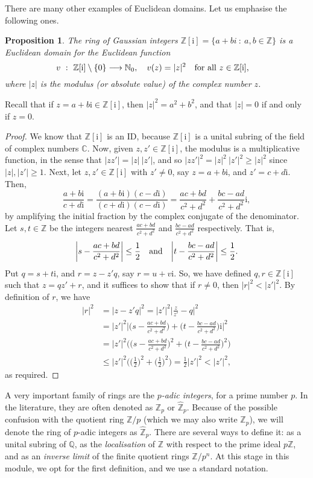 \documentclass[12pt]{article}
\newcommand{\qbox}[1]{\quad\hbox{#1}\quad}
\def\dst{\displaystyle}
\newtheorem{prop}[thm]{Proposition}
\theoremstyle{definition}
\newcounter{ex}\renewcommand\theex{\arabic{ex}}
\newcommand{\N}{\ensuremath{\mathbb{N}}}
\newcommand{\Z}{\ensuremath{\mathbb{Z}}}
\newcommand{\Q}{\ensuremath{\mathbb{Q}}}
\newcommand{\C}{\ensuremath{\mathbb{C}}}
\def\ii{\mathrm i}
\def\Zp{\widehat{\Z}_p}
\begin{document}
There are many other examples of Euclidean domains. Let us emphasise
the following ones.

\begin{prop}\label{prop:zi-ed}
The ring of Gaussian integers $\Z[\ii]=\{a+bi~:~a,b\in\Z\}$ is a
Euclidean domain for the Euclidean function
$$v~:~\Z[\ii]\setminus\{0\}\longrightarrow\N_0,\quad v(z)=|z|^2
\qbox{for all $z\in\Z[\ii]$,}$$
where $|z|$ is the modulus (or absolute value) of the complex number
$z$. 
\end{prop}
Recall that if $z=a+b\ii\in\Z[\ii]$, then $|z|^2=a^2+b^2$, and that
$|z|=0$ if and only if $z=0$.

\begin{proof}
We know that $\Z[\ii]$ is an ID, because $\Z[\ii]$ is a unital subring
of the field of complex numbers $\C$.
Now, given $z,z'\in\Z[\ii]$, the modulus is a multiplicative function,
in the sense that $|zz'|=|z|~|z'|$, and so
$|zz'|^2=|z|^2~|z'|^2\geq|z|^2$ since $|z|,|z'|\geq1$.
Next, let $z,z'\in\Z[\ii]$ with $z'\neq0$, say
$z=a+b\ii$, and $z'=c+d\ii$.
Then, 
$$\frac{a+b\ii}{c+d\ii}=\frac{(a+b\ii)(c-d\ii)}{(c+d\ii)(c-d\ii)}=
\frac{ac+bd}{c^2+d^2}+\frac{bc-ad}{c^2+d^2}\ii,$$
by amplifying the initial fraction by the complex conjugate of the
denominator.
Let $s,t\in\Z$ be the integers nearest $\dst\frac{ac+bd}{c^2+d^2}$ and
$\dst\frac{bc-ad}{c^2+d^2}$ respectively. That is,
$$\bigg| s-\frac{ac+bd}{c^2+d^2}\bigg|\leq\frac12\qbox{and}
\bigg| t-\frac{bc-ad}{c^2+d^2}\bigg|\leq\frac12.$$
Put $q=s+t\ii$, and $r=z-z'q$, say $r=u+v\ii$.
So, we have defined $q,r\in\Z[\ii]$ such that $z=qz'+r$, and it
suffices to show that if $r\neq0$, then $|r|^2<|z'|^2$.
By definition of $r$, we have
\begin{align*}
|r|^2&=|z-z'q|^2=|z'|^2\big|\frac z{z'}-q\big|^2\\
&=|z'|^2\bigg|\big(s-\frac{ac+bd}{c^2+d^2}\big)+
\big(t-\frac{bc-ad}{c^2+d^2}\big)\ii\bigg|^2\\
&=|z'|^2\bigg(\big(s-\frac{ac+bd}{c^2+d^2}\big)^2+
\big(t-\frac{bc-ad}{c^2+d^2}\big)^2\bigg)\\
&\leq|z'|^2\bigg(\big(\frac12\big)^2
+\big(\frac12\big)^2\bigg)=\frac12|z'|^2<|z'|^2,
\end{align*}
as required.
\end{proof}


A very important family of rings are the {\em $p$-adic integers},
 for
a prime number $p$. In the literature, they are often denoted as
$\Z_p$ or $\Zp$. Because of the possible confusion with the
quotient ring $\Z/p$ (which we may also write $\Z_p$), we will denote
the ring of $p$-adic integers as $\Zp$. There are several ways
to define it: as a unital subring of $\Q$, as the {\em localisation}
of $\Z$ with respect to the prime ideal $p\Z$, and as an
{\em inverse limit} of the finite quotient rings $\Z/p^n$. At this
stage in this module, we opt for the first definition, and we use 
a standard notation.
\end{document}
